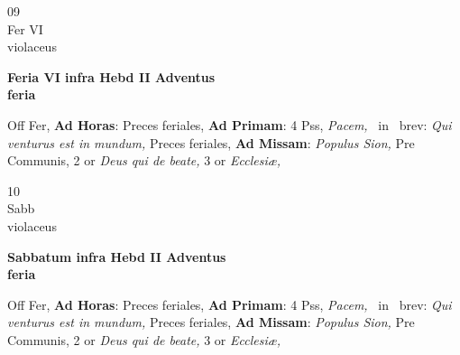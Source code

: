 \documentclass[10pt, openany]{book}
\begin{document}
        \begin{center}
            \begin{minipage}{3.5in}
                \vspace{2em}
                \begin{minipage}{0.5in}
                    {\Huge 09} \\
                    {\normalsize Fer VI} \\
                    {\normalsize violaceus}
                \end{minipage}
                \begin{minipage}{3.0in}
                    \textbf{ \large Feria VI infra Hebd II Adventus \\
                    \textnormal{\normalsize feria}} \\ 
                \end{minipage}
                \begin{justify}Off Fer, \textbf{Ad Horas}: Preces feriales, \textbf{Ad Primam}: 4 Pss, \textit{Pacem,} \Vbar\ in \Rbar\ brev: \textit{Qui venturus est in mundum,} Preces feriales, \textbf{Ad Missam}: \textit{Populus Sion,} Pre Communis, 2 or \textit{Deus qui de beate,} 3 or \textit{Ecclesiæ,}   
                \end{justify}
            \end{minipage}
        \end{center}
    
        \begin{center}
            \begin{minipage}{3.5in}
                \vspace{2em}
                \begin{minipage}{0.5in}
                    {\Huge 10} \\
                    {\normalsize Sabb} \\
                    {\normalsize violaceus}
                \end{minipage}
                \begin{minipage}{3.0in}
                    \textbf{ \large Sabbatum infra Hebd II Adventus \\
                    \textnormal{\normalsize feria}} \\ 
                \end{minipage}
                \begin{justify}Off Fer, \textbf{Ad Horas}: Preces feriales, \textbf{Ad Primam}: 4 Pss, \textit{Pacem,} \Vbar\ in \Rbar\ brev: \textit{Qui venturus est in mundum,} Preces feriales, \textbf{Ad Missam}: \textit{Populus Sion,} Pre Communis, 2 or \textit{Deus qui de beate,} 3 or \textit{Ecclesiæ,}   
                \end{justify}
            \end{minipage}
        \end{center}
    
\end{document}
